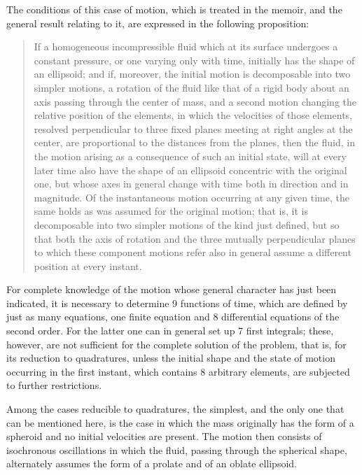 \documentclass[11pt]{article}
\begin{document}
The conditions of this case of motion, which is treated in the memoir, and the general result relating to it, are expressed in the following proposition:

\begin{quote}
If a homogeneous incompressible fluid which at its surface undergoes a constant pressure, or one varying only with time, initially has the shape of an ellipsoid; and if, moreover, the initial motion is decomposable into two simpler motions, a rotation of the fluid like that of a rigid body about an axis passing through the center of mass, and a second motion changing the relative position of the elements, in which the velocities of those elements, resolved perpendicular to three fixed planes meeting at right angles at the center, are proportional to the distances from the planes, then the fluid, in the motion arising as a consequence of such an initial state, will at every later time also have the shape of an ellipsoid concentric with the original one, but whose axes in general change with time both in direction and in magnitude. Of the instantaneous motion occurring at any given time, the same holds as was assumed for the original motion; that is, it is decomposable into two simpler motions of the kind just defined, but so that both the axis of rotation and the three mutually perpendicular planes to which these component motions refer also in general assume a different position at every instant.
\end{quote}

For complete knowledge of the motion whose general character has just been indicated, it is necessary to determine 9 functions of time, which are defined by just as many equations, one finite equation and 8 differential equations of the second order. For the latter one can in general set up 7 first integrals; these, however, are not sufficient for the complete solution of the problem, that is, for its reduction to quadratures, unless the initial shape and the state of motion occurring in the first instant, which contains 8 arbitrary elements, are subjected to further restrictions.

Among the cases reducible to quadratures, the simplest, and the only one that can be mentioned here, is the case in which the mass originally has the form of a spheroid and no initial velocities are present. The motion then consists of isochronous oscillations in which the fluid, passing through the spherical shape, alternately assumes the form of a prolate and of an oblate ellipsoid.
\end{document}
